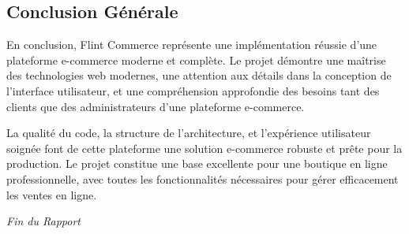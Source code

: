 \documentclass[12pt,a4paper]{article}
\begin{document}
\subsection{Conclusion Générale}

En conclusion, Flint Commerce représente une implémentation réussie d'une plateforme e-commerce moderne et complète. Le projet démontre une maîtrise des technologies web modernes, une attention aux détails dans la conception de l'interface utilisateur, et une compréhension approfondie des besoins tant des clients que des administrateurs d'une plateforme e-commerce.

La qualité du code, la structure de l'architecture, et l'expérience utilisateur soignée font de cette plateforme une solution e-commerce robuste et prête pour la production. Le projet constitue une base excellente pour une boutique en ligne professionnelle, avec toutes les fonctionnalités nécessaires pour gérer efficacement les ventes en ligne.

\vspace{1cm}

\begin{center}
\textit{Fin du Rapport}
\end{center}
\end{document}
